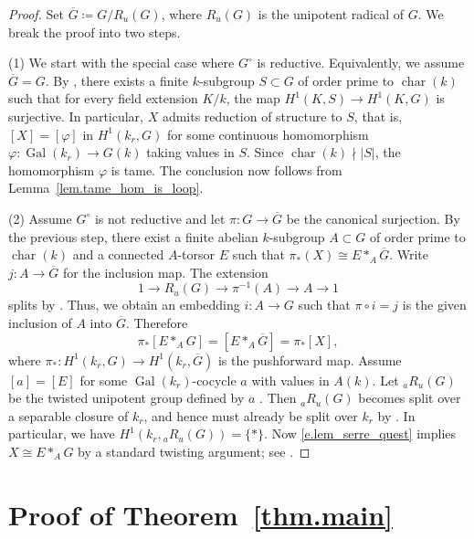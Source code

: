 \documentclass[12pt]{amsart}
\numberwithin{equation}{section}
\theoremstyle{remark}
\newcommand{\ol}{\overline}
\newcommand{\vphi}{\varphi}
\newcommand{\Gal}{\operatorname{Gal}}
\newcommand{\Char}{\operatorname{char}}
\begin{document}
\begin{proof}
Set $\ol{G} \coloneqq G/R_u(G)$, where $R_u(G)$ is the unipotent radical of $G$. We break the proof into two steps.

\smallskip
(1) We start with the special case where $G^{\circ}$ is reductive. Equivalently, we assume $\ol{G} = G$. By \cite[Corollaire 18]{lucchini2015groupe}, there exists a finite $k$-subgroup $S\subset G$ of order prime to $\Char(k)$ such that for every field extension $K/k$, the map $H^1(K,S)\to H^1(K,G)$ is surjective. In particular, $X$ admits reduction of structure to $S$, that is, $[X] = [\vphi]$ in $H^1(k_r,G)$ for some continuous homomorphism $\vphi\colon \Gal(k_r)\to G(k)$ taking values in $S$. Since $\Char(k)\nmid |S|$, the homomorphism $\vphi$ is tame. The conclusion now follows from Lemma~\ref{lem.tame_hom_is_loop}.

\smallskip
(2) Assume $G^{\circ}$ is not reductive and let $\pi\colon G\to \ol{G}$ be the canonical surjection. By the previous step, there exist a finite abelian $k$-subgroup $A\subset G$ of order prime to  $\Char(k)$ and a connected $A$-torsor $E$ such that $\pi_*(X) \cong E \ast_A \ol{G}$. Write $j\colon A\to \ol{G}$ for the inclusion map. The extension
$$ 1\longrightarrow R_u(G) \longrightarrow \pi^{-1}(A) \longrightarrow A \longrightarrow 1$$
splits by \cite[Expos\'e XVII, Théorème 5.1.1]{SGA3}. Thus, we obtain an embedding $i\colon A \to G$ such that $\pi\circ i = j$ is the given inclusion of $A$ into $\ol{G}$. Therefore
\begin{equation}\label{e.lem_serre_quest}
\pi_*[E\ast_A G] = [E\ast_{A} \ol{G}] = \pi_*[X],
\end{equation}
where $\pi_*\colon H^1(k_r,G)\to H^1(k_r,\ol{G})$ is the pushforward map.
Assume $[a] = [E]$ for some $\Gal(k_r)$-cocycle $a$ with values in $A(k)$. Let ${}_{a}R_{u}(G)$ be the twisted unipotent group defined by $a$ \cite[Chapter I, Section 5.3]{serre1997galois}. Then ${}_{a}R_{u}(G)$ becomes split over a separable closure of $k_r$, and hence must already be split over $k_r$ by \cite[Theorem B.3.4]{conrad-gabber-prasad}. In particular, we have $H^1(k_r, {}_{a} R_u(G)) = \{\ast\}$. Now \eqref{e.lem_serre_quest} implies $X \cong E\ast_A G$ by a standard twisting argument; see \cite[Chapter I, Section 5.5, Corollary 2]{serre1997galois}.
\end{proof}




\section{Proof of Theorem~\ref{thm.main}} %
\end{document}
